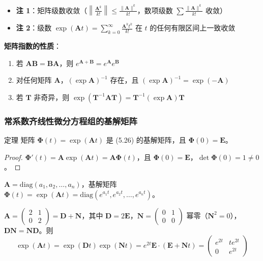 \begin{itemize}
    \item \textbf{注 1}：矩阵级数收敛（$\left\|\frac{\mathbf{A}^k}{k!}\right\| \le \frac{\|\mathbf{A}\|^k}{k!}$，数项级数 $\sum \frac{\|\mathbf{A}\|^k}{k!}$ 收敛）
    \item \textbf{注 2}：级数 $\exp(\mathbf{A}t) = \sum_{k=0}^{\infty}\frac{\mathbf{A}^k t^k}{k!}$ 在 $t$ 的任何有限区间上一致收敛
\end{itemize}

\textbf{矩阵指数的性质}：
\begin{enumerate}
    \item 若 $\mathbf{AB} = \mathbf{BA}$，则 $e^{\mathbf{A}+\mathbf{B}} = e^{\mathbf{A}}e^{\mathbf{B}}$
    \item 对任何矩阵 $\mathbf{A}$，$(\exp\mathbf{A})^{-1}$ 存在，且 $(\exp\mathbf{A})^{-1} = \exp(-\mathbf{A})$
    \item 若 $\mathbf{T}$ 非奇异，则 $\exp(\mathbf{T}^{-1}\mathbf{A}\mathbf{T}) = \mathbf{T}^{-1}(\exp\mathbf{A})\mathbf{T}$
\end{enumerate}

\subsubsection{常系数齐线性微分方程组的基解矩阵}

\begin{myTheorem}{定理}
矩阵 $\boldsymbol{\Phi}(t) = \exp(\mathbf{A}t)$ 是 (5.26) 的基解矩阵，且 $\boldsymbol{\Phi}(0) = \mathbf{E}$。
\end{myTheorem}

\begin{proof}
$\boldsymbol{\Phi}'(t) = \mathbf{A}\exp(\mathbf{A}t) = \mathbf{A}\boldsymbol{\Phi}(t)$，且 $\boldsymbol{\Phi}(0) = \mathbf{E}$，$\det\boldsymbol{\Phi}(0) = 1 \neq 0$。
\end{proof}

\begin{example}[对角矩阵]
$\mathbf{A} = \mathrm{diag}(a_1, a_2, \ldots, a_n)$，基解矩阵 $\boldsymbol{\Phi}(t) = \exp(\mathbf{A}t) = \mathrm{diag}(e^{a_1t}, e^{a_2t}, \ldots, e^{a_nt})$。
\end{example}

\begin{example}
$\mathbf{A} = \begin{pmatrix} 2 & 1 \\ 0 & 2 \end{pmatrix} = \mathbf{D} + \mathbf{N}$，其中 $\mathbf{D} = 2\mathbf{E}$，$\mathbf{N} = \begin{pmatrix} 0 & 1 \\ 0 & 0 \end{pmatrix}$ 幂零（$\mathbf{N}^2 = 0$），$\mathbf{DN} = \mathbf{ND}$。则
$$\exp(\mathbf{A}t) = \exp(\mathbf{D}t)\exp(\mathbf{N}t) = e^{2t}\mathbf{E}\cdot(\mathbf{E} + \mathbf{N}t) = \begin{pmatrix} e^{2t} & te^{2t} \\ 0 & e^{2t} \end{pmatrix}$$
\end{example}

